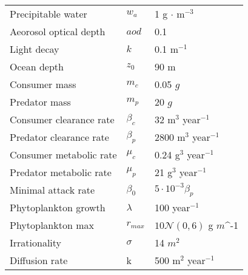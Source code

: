 \begin{tabular}{l | l | l}
  Precipitable water & $w_a$ & 1 g $\cdot$ m$^{-3}$\\
  Aeorosol optical depth & $aod$ & 0.1 \\
  Light decay & $k$ & 0.1 m$^{-1}$\\
  Ocean depth & $z_0$ & 90 m \\
  Consumer mass & $m_c$ & 0.05 $g$ \\
  Predator mass & $m_p$ & 20 $g$ \\
  Consumer clearance rate & $\beta_c$ & 32 m$^{3}$ year$^{-1}$ \\
  Predator clearance rate & $\beta_p$ & 2800 m$^3$ year$^{-1}$ \\
  Consumer metabolic rate & $\mu_c$ & 0.24 g$^{3}$ year$^{-1}$ \\
  Predator metabolic rate & $\mu_p$ & 21 g$^3$ year$^{-1}$ \\

  Minimal attack rate & $\beta_0$ & $5 \cdot 10^{-3} \beta_p$ \\
  Phytoplankton growth & $\lambda$ & 100 year$^{-1}$ \\
  Phytoplankton max & $r_{max}$ & $10\mathcal{N}(0,6)$ g $m$^{-1} \\
  Irrationality & $\sigma$ & 14 $m^2$ \\
  Diffusion rate & k & 500 m$^{2}$ year$^{-1}$
\end{tabular}
